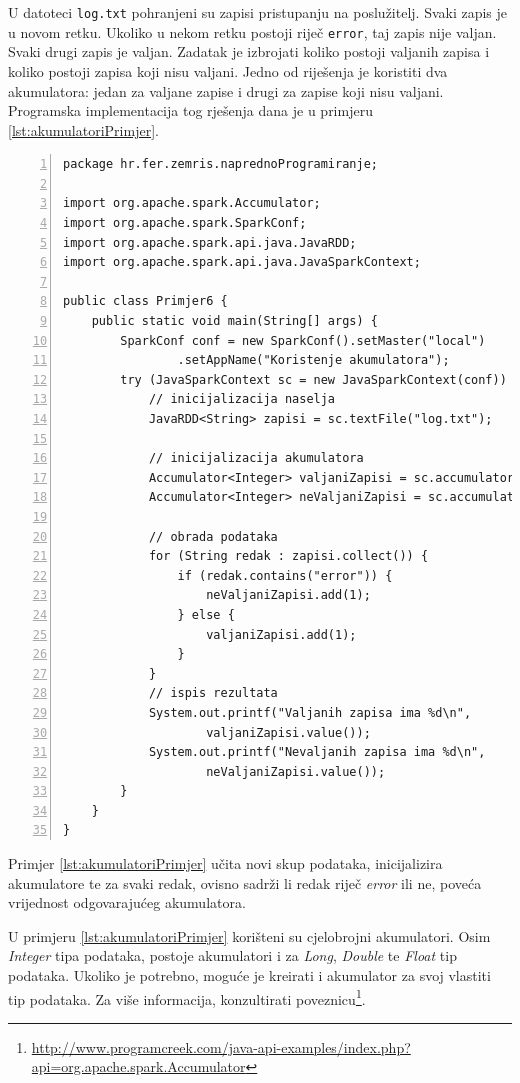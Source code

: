 \documentclass[times, utf8, zavrsni, numeric]{fer}
\begin{document}
U datoteci \texttt{log.txt} pohranjeni su zapisi pristupanju na poslužitelj. Svaki zapis je u novom retku. Ukoliko u nekom retku postoji riječ \texttt{error}, taj zapis nije valjan. Svaki drugi zapis je valjan. Zadatak je izbrojati koliko postoji valjanih zapisa i koliko postoji zapisa koji nisu valjani. Jedno od riješenja je koristiti dva akumulatora: jedan za valjane zapise i drugi za zapise koji nisu valjani. Programska implementacija tog rješenja dana je u primjeru \ref{lst:akumulatoriPrimjer}.

\begin{lstlisting}[numbers=left, label={lst:akumulatoriPrimjer}, caption={Korištenje akumulatora.}, escapechar=|]
package hr.fer.zemris.naprednoProgramiranje;

import org.apache.spark.Accumulator;
import org.apache.spark.SparkConf;
import org.apache.spark.api.java.JavaRDD;
import org.apache.spark.api.java.JavaSparkContext;

public class Primjer6 {
	public static void main(String[] args) {
		SparkConf conf = new SparkConf().setMaster("local")
				.setAppName("Koristenje akumulatora");
		try (JavaSparkContext sc = new JavaSparkContext(conf)) {
			// inicijalizacija naselja
			JavaRDD<String> zapisi = sc.textFile("log.txt");

			// inicijalizacija akumulatora
			Accumulator<Integer> valjaniZapisi = sc.accumulator(0);
			Accumulator<Integer> neValjaniZapisi = sc.accumulator(0);

			// obrada podataka
			for (String redak : zapisi.collect()) {
				if (redak.contains("error")) {
					neValjaniZapisi.add(1);
				} else {
					valjaniZapisi.add(1);
				}
			}
			// ispis rezultata
			System.out.printf("Valjanih zapisa ima %d\n",
					valjaniZapisi.value());
			System.out.printf("Nevaljanih zapisa ima %d\n",
					neValjaniZapisi.value());
		}
	}
}
\end{lstlisting}

Primjer \ref{lst:akumulatoriPrimjer} učita novi skup podataka, inicijalizira akumulatore te za svaki redak, ovisno sadrži li redak riječ \emph{error} ili ne, poveća vrijednost odgovarajućeg akumulatora.

U primjeru \ref{lst:akumulatoriPrimjer} korišteni su cjelobrojni akumulatori. Osim \emph{Integer} tipa podataka, postoje akumulatori i za \emph{Long}, \emph{Double} te \emph{Float} tip podataka. Ukoliko je potrebno, moguće je kreirati i akumulator za svoj vlastiti tip podataka. Za više informacija, konzultirati poveznicu\footnote{\url{http://www.programcreek.com/java-api-examples/index.php?api=org.apache.spark.Accumulator}}.
\end{document}
